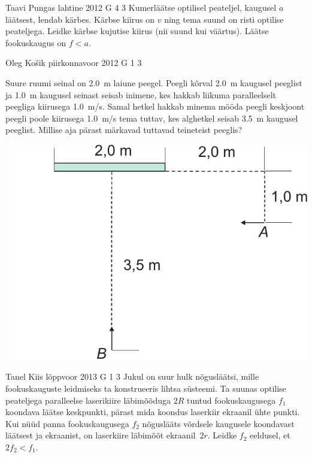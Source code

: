 \documentclass[11pt, twoside]{article}
\begin{document}
{{\begin{center}
\end{center}
\fi
}

{Taavi Pungas} %
{lahtine} %
{2012} %
{G 4} %
{3} %
{
\ifStatement
Kumerläätse optilisel peateljel, kaugusel $a$ läätsest, lendab kärbes.
Kärbse kiirus on $v$ ning tema suund on risti optilise peateljega.
Leidke kärbse kujutise kiirus (nii suund kui väärtus). Läätse
fookuskaugus on $f < a$.
\fi
}

{Oleg Košik} %
{piirkonnavoor} %
{2012} %
{G 1} %
{3} %
{
\ifStatement
Suure ruumi seinal on \SI{2,0}{m} laiune peegel. Peegli kõrval \SI{2,0}{m}
kaugusel peeglist ja \SI{1,0}{m} kaugusel seinast seisab inimene, kes hakkab
liikuma paralleelselt peegliga kiirusega \SI{1,0}{m/s}. Samal hetkel hakkab
minema mööda peegli keskjoont peegli poole kiirusega \SI{1,0}{m/s} tema tuttav,
kes alghetkel seisab \SI{3,5}{m} kaugusel peeglist. Millise aja pärast
märkavad tuttavad teineteist peeglis?

\begin{center}
\includegraphics[width=0.5\linewidth]{2012-v2g-01-peegel2}%
\end{center}
\fi
}

{Tanel Kiis} %
{lõppvoor} %
{2013} %
{G 1} %
{3} %
{
\ifStatement
Jukul on suur hulk nõgusläätsi, mille fookuskauguste leidmiseks ta konstrueeris lihtsa
süsteemi. Ta suunas optilise peateljega paralleelse
laserikiire läbimõõduga $2R$ tuntud fookuskaugusega
$f_1$ koondava läätse keskpunkti, pärast mida koondus laserkiir ekraanil ühte punkti. Kui nüüd panna
fookuskaugusega $f_2$ nõguslääts võrdsele kaugusele koondavast läätsest ja
ekraanist, on laserkiire läbimõõt ekraanil~$2r$. Leidke $f_2$ eeldusel, et~$2f_2 < f_1$.
\fi
}

}
\end{document}
